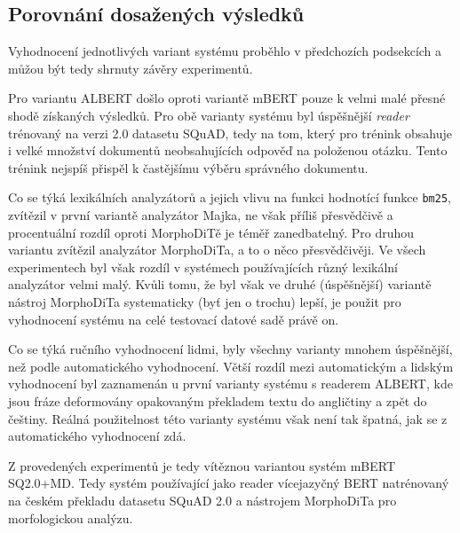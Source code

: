 \subsection{Porovnání dosažených výsledků}
Vyhodnocení jednotlivých variant systému proběhlo v předchozích podsekcích a můžou být tedy shrnuty závěry experimentů. \par
Pro variantu ALBERT došlo oproti variantě mBERT pouze k velmi malé přesné shodě získaných výsledků. Pro obě varianty systému byl úspěšnější \emph{reader} trénovaný na verzi 2.0 datasetu SQuAD, tedy na tom, který pro trénink obsahuje i velké množství dokumentů neobsahujících odpověď na položenou otázku. Tento trénink nejspíš přispěl k častějšímu výběru správného dokumentu.\par
Co se týká lexikálních analyzátorů a jejich vlivu na funkci hodnotící funkce \texttt{bm25}, zvítězil v první variantě analyzátor Majka, ne však příliš přesvědčivě a procentuální rozdíl oproti MorphoDiTě je téměř zanedbatelný. Pro druhou variantu zvítězil analyzátor MorphoDiTa, a to o něco přesvědčivěji. Ve všech experimentech byl však rozdíl v systémech používajících různý lexikální analyzátor velmi malý. Kvůli tomu, že byl však ve druhé (úspěšnější) variantě nástroj MorphoDiTa systematicky (byť jen o trochu) lepší, je použit pro vyhodnocení systému na celé testovací datové sadě právě on.\par
Co se týká ručního vyhodnocení lidmi, byly všechny varianty mnohem úspěšnější, než podle automatického vyhodnocení. Větší rozdíl mezi automatickým a lidským vyhodnocení byl zaznamenán u první varianty systému s readerem ALBERT, kde jsou fráze deformovány opakovaným překladem textu do angličtiny a zpět do češtiny. Reálná použitelnost této varianty systému však není tak špatná, jak se z automatického vyhodnocení zdá.\par
Z provedených experimentů je tedy vítěznou variantou systém mBERT SQ2.0+MD. Tedy systém používající jako reader vícejazyčný BERT natrénovaný na českém překladu datasetu SQuAD 2.0 a nástrojem MorphoDiTa pro morfologickou analýzu.


